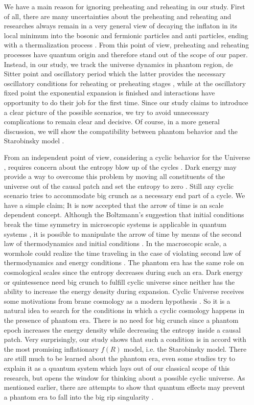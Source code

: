 \documentclass[a4paper,11pt]{article}
\begin{document}
We have a main reason for ignoring preheating and reheating in our study. First of all, there are many uncertainties about the preheating and reheating and researches always remain in a very general view of decaying the inflaton in its local minimum into the bosonic and fermionic particles and anti particles, ending with a thermalization process \cite{reh2}. From this point of view, preheating and reheating processes have quantum origin and therefore stand out of the scope of our paper. Instead, in our study, we track the universe dynamics in phantom region, de Sitter point and oscillatory period which the latter provides the necessary oscillatory conditions for reheating or preheating stages \cite{imgg,fel}, while at the oscillatory fixed point the exponential expansion is finished and interactions have opportunity to do their job for the first time. Since our study claims to introduce a clear picture of the possible scenarios, we try to avoid unnecessary complications to remain clear and decisive. Of course, in a more general discussion, we will show the compatibility between phantom behavior and the Starobinsky model \cite{sby}.

From an independent point of view, considering a cyclic behavior for the Universe \cite{Ein}, requires concern about the entropy blow up of the cycles \cite{tol}. Dark energy may provide a way to overcome this problem by moving all constituents of the universe out of the causal patch and set the entropy to zero \cite{cyc,Pt}. Still any cyclic scenario tries to accommodate big crunch as a necessary end part of a cycle. We have a simple claim; It is now accepted that the arrow of time is an scale dependent concept. Although the Boltzmann's suggestion that initial conditions break the time symmetry in microscopic systems is applicable in quantum systems \cite{Blz}, it is possible to manipulate the arrow of time by means of the second law of thermodynamics and initial conditions \cite{reve}. In the macroscopic scale, a wormhole could realize the time traveling in the case of violating second law of thermodynamics and energy conditions \cite{wmh}. The phantom era has the same role on cosmological scales \cite{wec,mcb} since the entropy decreases during such an era. Dark energy or quintessence \cite{nhr} need big crunch to fulfill cyclic universe since neither has the ability to increase the energy density during expansion. Cyclic Universe receives some motivations from brane cosmology as a modern hypothesis \cite{mcb}. So it is a natural idea to search for the conditions in which a cyclic cosmology happens in the presence of phantom era. There is no need for big crunch since a phantom epoch increases the energy density while decreasing the entropy inside a causal patch. Very surprisingly, our study shows that such a condition is in accord with the most promising inflationary $f(R)$ model, i.e. the Starobinsky model. There are still much to be learned about the phantom era, even some studies try to explain it as a quantum system which lays out of our classical scope of this research, but opens the window for thinking about a possible cyclic universe. As mentioned earlier, there are attempts to show that quantum effects may prevent a phantom era to fall into the big rip singularity \cite{qpc,prm}.
\end{document}
